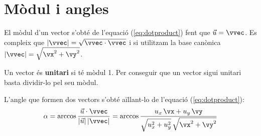\documentclass[11pt, a4paper, pdf]{article}
\begin{document}
 
 
 \section{Mòdul i angles}
 \begin{theorybox}
 	El mòdul d'un vector s'obté de l'equació (\ref{eq:dotproduct}) fent que $\vec u = \vvec$. Es compleix que $|\vvec| = \sqrt{\vvec \cdot \vvec}$ i si utilitzam la base canònica  $| \vvec |=\sqrt{\vx^2+\vy^2}$.
 	
 	Un vector és \textbf{unitari} si té mòdul 1. Per conseguir que un vector sigui unitari basta dividir-lo pel seu mòdul.
 	
 	L'angle que formen dos vectors s'obté aïllant-lo de l'equació  (\ref{eq:dotproduct}):
 	\begin{equation}
 	\label{eq:angle}
 	\alpha = \arccos \dfrac{\vec u \cdot \vvec}{|\vec u|\, |\vvec|} = \arccos \dfrac{ u_x \, \vx + u_y\, \vy }{\sqrt{u_x^2+u_y^2} \, \sqrt{\vx^2+\vy^2}} 
 	\end{equation}
 \end{theorybox}
  
\end{document}
